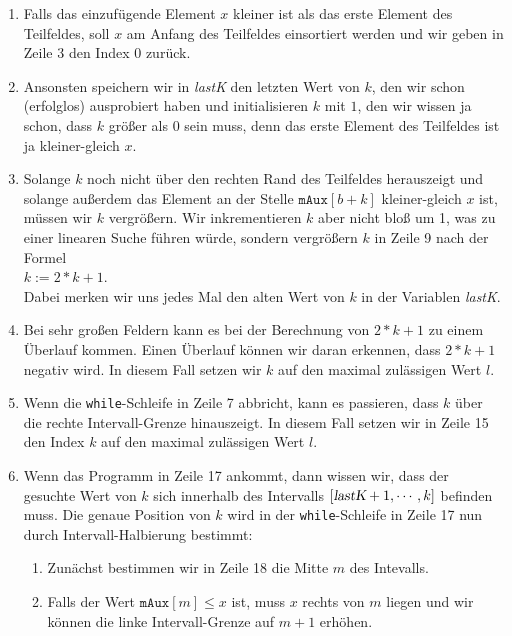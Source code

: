 \begin{enumerate}
\item Falls das einzuf\"ugende Element $x$ kleiner ist als das erste Element des Teilfeldes,
      soll $x$ am Anfang des Teilfeldes einsortiert werden und wir geben in Zeile
      3 den Index 0 zur\"uck.
\item Ansonsten speichern wir in \textsl{lastK} den letzten Wert von $k$, den wir schon
      (erfolglos) ausprobiert haben und initialisieren $k$ mit $1$, den wir wissen ja schon,
      dass $k$ gr\"o{\ss}er als $0$ sein muss, denn das erste Element des Teilfeldes ist ja kleiner-gleich
      $x$.
\item Solange $k$ noch nicht \"uber den rechten Rand des Teilfeldes herauszeigt und solange au{\ss}erdem
      das Element an der Stelle $\mathtt{mAux}[b + k]$ kleiner-gleich $x$ ist, m\"ussen wir $k$ vergr\"o{\ss}ern.
      Wir inkrementieren $k$ aber nicht blo{\ss} um 1, was zu einer linearen Suche f\"uhren w\"urde, sondern
      vergr\"o{\ss}ern $k$ in Zeile 9 nach der Formel
      \\[0.2cm]
      \hspace*{1.3cm}
      $k := 2 * k + 1$.
      \\[0.2cm]
      Dabei merken wir uns jedes Mal den alten Wert von $k$ in der Variablen \textsl{lastK}.
\item Bei sehr gro{\ss}en Feldern kann es bei der Berechnung von $2 * k + 1$ zu einem
      Überlauf kommen.  Einen Überlauf k\"onnen wir daran erkennen, dass $2 * k + 1$ negativ wird.
      In diesem Fall setzen wir $k$ auf den maximal zul\"assigen Wert $l$.
\item Wenn die \texttt{while}-Schleife in Zeile 7 abbricht, kann es passieren, dass $k$ \"uber die
      rechte Intervall-Grenze 
      hinauszeigt.  In diesem Fall setzen wir in Zeile 15 den Index $k$ auf den maximal zul\"assigen Wert $l$.
\item Wenn das Programm in Zeile 17 ankommt, dann wissen wir, dass der gesuchte Wert von $k$ sich
      innerhalb des Intervalls $[\textsl{lastK}+ 1, \cdots, k]$ befinden muss.  Die genaue Position
      von $k$ wird in der \texttt{while}-Schleife in Zeile 17 nun durch Intervall-Halbierung
      bestimmt:
      \begin{enumerate}
      \item Zun\"achst bestimmen wir in Zeile 18 die Mitte $m$ des Intevalls.
      \item Falls der Wert $\mathtt{mAux}[m] \leq x$ ist, muss $x$ rechts von $m$ liegen
            und wir k\"onnen die linke Intervall-Grenze auf $m+1$ erh\"ohen.

\end{enumerate}
\end{enumerate}
